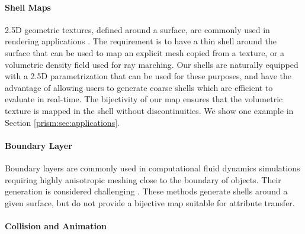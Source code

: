 \paragraph{Shell Maps}
2.5D geometric textures, defined around a surface, are commonly used in rendering applications \cite{wang2003view,wang2004generalized,porumbescu2005shell,peng2004interactive,lengyel2001real,chen2004shell,huang2007gradient,jin2019shell}. The requirement is to have a thin shell around the surface that can be used to map an explicit mesh copied from a texture, or a volumetric density field used for ray marching. Our shells are naturally equipped with a 2.5D parametrization that can be used for these purposes, and have the advantage of allowing users to  generate coarse shells which are efficient to evaluate in real-time. The bijectivity of our map ensures that the  volumetric texture is mapped in the shell without discontinuities. We show one example in Section \ref{prism:sec:applications}.

\paragraph{Boundary Layer}

Boundary layers are commonly used in computational fluid dynamics simulations requiring highly anisotropic meshing close to the boundary of objects. Their generation is considered challenging \cite{aubry2015most,aubry2017boundary,garimella2000boundary}. These methods generate shells around a given surface, but do not provide a bijective map suitable for attribute transfer.

\paragraph{Collision and Animation}

